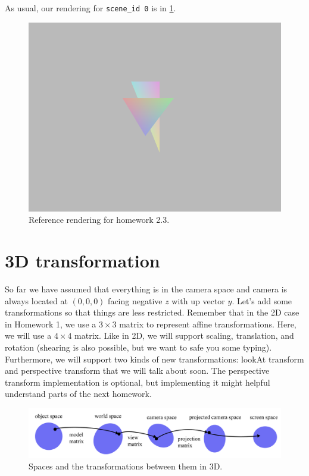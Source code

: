 As usual, our rendering for \lstinline{scene_id 0} is in \cref{fig:hw2_3}.
\begin{figure}[h]
    \centering
    \includegraphics[width=0.5\linewidth]{imgs/hw_2_3.png}
    \caption{Reference rendering for homework 2.3.}
    \label{fig:hw2_3}
\end{figure}

\section{3D transformation}

So far we have assumed that everything is in the camera space and camera is always located at $(0, 0, 0)$ facing negative $z$ with up vector $y$. Let's add some transformations so that things are less restricted. Remember that in the 2D case in Homework 1, we use a $3 \times 3$ matrix to represent affine transformations. Here, we will use a $4 \times 4$ matrix. Like in 2D, we will support scaling, translation, and rotation (shearing is also possible, but we want to safe you some typing). Furthermore, we will support two kinds of new transformations: lookAt transform and perspective transform that we will talk about soon. The perspective transform implementation is optional, but implementing it might helpful understand parts of the next homework.

\begin{figure}[h]
    \centering
    \includegraphics[width=0.8\linewidth]{imgs/3d_spaces.pdf}
    \caption{Spaces and the transformations between them in 3D.}
    \label{fig:3d_spaces}
\end{figure}


